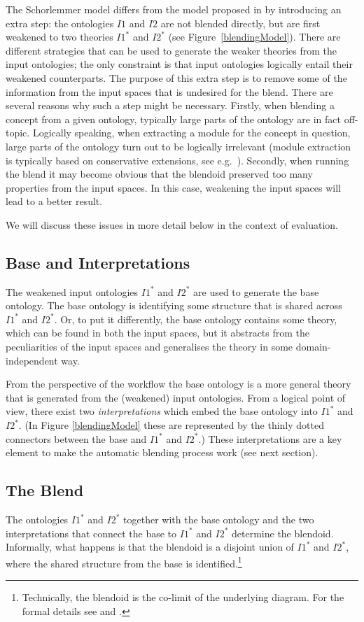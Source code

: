 \documentclass{ecai2012}
\begin{document}
The Schorlemmer model differs from the model proposed in  \cite{goguenharrell10} by introducing an extra step:
 the ontologies  $I1$ and $I2$ are not blended directly, but are first weakened to two theories 
 $I1^*$ and $I2^*$ (see Figure~\ref{blendingModel}).  There are different strategies that can be used to generate  the weaker theories
  from the input ontologies; the only constraint is that input ontologies logically entail their weakened 
  counterparts. The purpose of this extra step is to remove some of the information from the input spaces 
  that is undesired for the blend. There are several reasons why such a step might be necessary. Firstly, when blending a concept from a given ontology, typically large parts of the ontology are in fact off-topic. Logically speaking, when extracting a module for the concept in question, large parts of the ontology turn out to be logically irrelevant (module extraction is typically based on conservative extensions, see e.g.\ \cite{KLWW-ECAI-08}). Secondly, when running the blend it may become obvious that the blendoid preserved too many properties from the input spaces. In this case,  weakening the input spaces will lead to a better result. 
  
  \smallskip\noindent
  We will discuss these issues in more detail below in the context of evaluation. 

\subsection{Base and Interpretations}
The weakened input ontologies $I1^*$ and $I2^*$ are used to generate the base ontology. 
The base ontology is identifying some structure that is shared across $I1^*$ and $I2^*$.
 Or, to put it differently, the base ontology contains some theory, which can be found in
  both the input spaces, but it abstracts from the peculiarities of the input spaces and generalises the theory in some domain-independent way. 

From the perspective of the workflow the base ontology is a more general theory that
 is generated  from the (weakened) input ontologies. From a logical point of view, 
 there exist two \emph{interpretations} which embed the base ontology into  $I1^*$ 
 and $I2^*$. (In Figure \ref{blendingModel} these are represented by the thinly dotted 
 connectors between the base and  $I1^*$ and $I2^*$.) These interpretations are a key 
 element to make the automatic blending process work (see next section). 

\subsection{The Blend} 
The ontologies  $I1^*$ and $I2^*$ together with the base ontology and the two
  interpretations that connect the base to  $I1^*$ and $I2^*$ determine the blendoid. 
  Informally, what happens is that the blendoid is a disjoint union of $I1^*$ and $I2^*$, 
  where the shared structure from  the base is identified.\footnote{Technically, the 
  blendoid is the co-limit of the underlying diagram. For the formal details see \cite{AHS} and \cite{blendingc3gi12}.}
\end{document}
